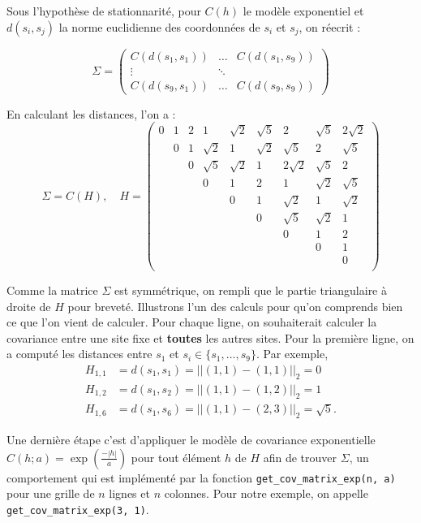 \documentclass[10pt]{article} %
\begin{document}
Sous l'hypothèse de stationnarité, pour $C(h)$ le modèle exponentiel et $d(s_i, s_j)$ la norme euclidienne des coordonnées
de $s_i$ et $s_j$, on réecrit :

$$
\Sigma =
\begin{pmatrix}
    C(d(s_1, s_1)) & \dots & C(d(s_1, s_9)) \\
    \vdots & \ddots & \\
    C(d(s_9, s_1)) & \dots & C(d(s_9, s_9))
\end{pmatrix}
$$

En calculant les distances, l'on a :
$$
\Sigma = C(H), \quad H =
\begin{pmatrix}
    0 & 1 & 2 & 1 & \sqrt{2} & \sqrt{5} & 2 & \sqrt{5} & 2\sqrt{2} \\
     & 0 & 1 & \sqrt{2} & 1 & \sqrt{2} & \sqrt{5} & 2 & \sqrt{5} \\
     &  & 0 & \sqrt{5} & \sqrt{2} & 1 & 2\sqrt{2} & \sqrt{5} & 2\\
     & & & 0 & 1 & 2 & 1 & \sqrt{2} & \sqrt{5} \\
     & & & & 0 & 1 & \sqrt{2} & 1 & \sqrt{2} \\
     & & & & & 0 & \sqrt{5} & \sqrt{2} & 1 \\
     & & & & & & 0 & 1 & 2 \\
     & & & & & & & 0 & 1 \\
     & & & & & & & & 0 \\
\end{pmatrix}
$$

Comme la matrice $\Sigma$ est symmétrique, on rempli que le partie triangulaire à droite de $H$ pour breveté. Illustrons l'un des calculs pour qu'on comprends
bien ce que l'on vient de calculer. Pour chaque ligne, on souhaiterait calculer la covariance entre une site fixe et \textbf{toutes} les autres sites.
Pour la première ligne, on a computé les distances entre $s_1$ et $s_i \in \{s_1, \dots, s_9\}$. Par exemple,
\begin{align*}
    H_{1, 1} &= d(s_1, s_1) = ||(1, 1) - (1, 1)||_2 = 0 \\
    H_{1, 2} &= d(s_1, s_2) = ||(1, 1) - (1, 2)||_2 = 1 \\
    H_{1, 6} &= d(s_1, s_6) = ||(1, 1) - (2, 3)||_2 = \sqrt{5}.
\end{align*}

Une dernière étape c'est d'appliquer le modèle de covariance exponentielle $C(h; a) = \exp(\frac{-|h|}{a})$ pour tout élément $h$ de $H$ afin de trouver $\Sigma$, un comportement qui est implémenté par la fonction
\texttt{get\_cov\_matrix\_exp(n, a)} pour une grille de $n$ lignes et $n$ colonnes. Pour notre exemple, on appelle \texttt{get\_cov\_matrix\_exp(3, 1)}.
\end{document}
